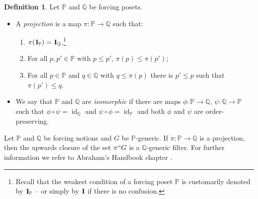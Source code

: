 \documentclass[11pt]{amsart}
\theoremstyle{definition}
\newtheorem{definition}[theorem]{Definition}
\theoremstyle{remark}
\DeclareMathOperator{\id}{id}
\newcommand{\one}{\mathop{1\hskip-3pt {\rm l}}}
\begin{document}
    \begin{definition}\label{def: projections}
        Let $\mathbb{P}$ and $\mathbb{Q}$ be forcing posets. \begin{itemize}
\item  A \emph{projection} is a map $\pi\colon \mathbb{P}\rightarrow\mathbb{Q}$ such that: \begin{enumerate}
\item $\pi(\one_{\mathbb{P}})=\one_{\mathbb{Q}}$.\footnote{Recall that the weakest condition of a forcing poset $\mathbb{P}$ is customarily denoted by $\one_{\mathbb{P}}$ -- or simply by $\one$ if there is no confusion. }
            \item For all $p,p'\in\mathbb{P}$ with $p\leq p'$, $\pi(p)\leq \pi(p')$;
            \item {For all $p\in\mathbb{P}$ and $q\in \mathbb{Q}$ with $q\leq \pi(p)$ there is $p'\leq p$  such that $\pi(p')\leq q$.}
        \end{enumerate} 
        
            \item We say that $\mathbb{P}$ and $\mathbb{Q}$ are  \emph{isomorphic} if there are maps $\phi\colon \mathbb{P}\to \mathbb{Q}$, $\psi\colon \mathbb{Q}\to \mathbb{P}$ such that $\phi\circ \psi=\id_{\mathbb{Q}}$ and $\psi\circ \phi=\id_{\mathbb{P}}$ and both $\phi$ and $\psi$ are order-preserving.
        \end{itemize} 
    \end{definition}


        Let $\mathbb{P}$ and $\mathbb{Q}$ be forcing notions and $G$ be $\mathbb{P}$-generic. If $\pi\colon \mathbb{P}\rightarrow\mathbb{Q}$ {is a projection}, then the upwards closure of the set $\pi``G$
            is a $\mathbb{Q}$-generic filter. For further information we refer to Abraham's Handbook chapter \cite{Abra}.

            \smallskip
            
\end{document}

